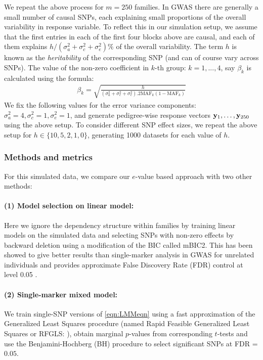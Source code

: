 We repeat the above process for $m=250$ families. In GWAS there are generally a small number of causal SNPs, each explaining small proportions of the overall variability in response variable. To reflect this in our simulation setup, we assume that the first entries in each of the first four blocks above are causal, and each of them explains $h/(\sigma_a^2+\sigma_c^2+\sigma_e^2) \%$ of the overall variability. The term $h$ is known as the \textit{heritability} of the corresponding SNP (and can of course vary across SNPs). The value of the non-zero coefficient in $k$-th group: $k = 1, ..., 4$, say $\beta_k$ is calculated using the formula:
%
\begin{align}
\beta_k = \sqrt{ \frac{h}{(\sigma_a^2+\sigma_c^2+\sigma_e^2). 2 \text{MAF}_k (1 - \text{MAF}_k) }}
\end{align}
%
We fix the following values for the error variance components: $\sigma_a^2 = 4, \sigma_c^2 = 1, \sigma_e^2 = 1$, and generate pedigree-wise response vectors ${\bf{y}}_1, \ldots, {\bf{y}}_{250}$ using the above setup. To consider different SNP effect sizes, we repeat the above setup for $h \in \{10, 5, 2, 1, 0 \}$, generating 1000 datasets for each value of $h$.

\subsubsection{Methods and metrics}
For this simulated data, we compare our $e$-value based approach with two other methods:

\paragraph{(1) Model selection on linear model:} Here we ignore the dependency structure within families by training linear models on the simulated data and selecting SNPs with non-zero effects by backward deletion using a modification of the BIC called mBIC2. This has been showed to give better results than single-marker analysis in GWAS for unrelated individuals \citep{FrommeletEtal12} and provides approximate False Discovery Rate (FDR) control at level 0.05 \citep{BogdanEtal11}.

\paragraph{(2) Single-marker mixed model:} We train single-SNP versions of \ref{eqn:LMMeqn} using a fast approximation of the Generalized Least Squares procedure (named Rapid Feasible Generalized Least Squares or RFGLS: \cite{LiEtal11}), obtain marginal $p$-values from corresponding $t$-tests and use the Benjamini-Hochberg (BH) procedure to select significant SNPs at FDR = $0.05$.

